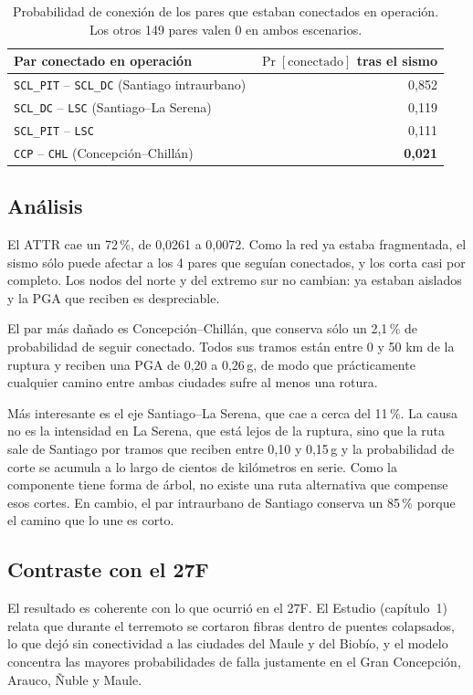 \documentclass[11pt,a4paper]{article}
\newcommand{\cod}[1]{\texttt{#1}}
\begin{document}
\begin{table}[h]
\centering
\begin{tabular}{lr}
\toprule
Par conectado en operación & $\Pr[\text{conectado}]$ tras el sismo \\
\midrule
\cod{SCL\_PIT} -- \cod{SCL\_DC} (Santiago intraurbano) & 0,852 \\
\cod{SCL\_DC} -- \cod{LSC} (Santiago--La Serena) & 0,119 \\
\cod{SCL\_PIT} -- \cod{LSC} & 0,111 \\
\cod{CCP} -- \cod{CHL} (Concepción--Chillán) & \textbf{0,021} \\
\bottomrule
\end{tabular}
\caption{Probabilidad de conexión de los pares que estaban conectados en operación. Los otros 149
pares valen 0 en ambos escenarios.}
\end{table}

\subsection{Análisis}
El ATTR cae un 72\,\%, de 0,0261 a 0,0072. Como la red ya estaba fragmentada, el sismo sólo puede
afectar a los 4 pares que seguían conectados, y los corta casi por completo. Los nodos del norte y del
extremo sur no cambian: ya estaban aislados y la PGA que reciben es despreciable.

El par más dañado es Concepción--Chillán, que conserva sólo un 2,1\,\% de probabilidad de seguir
conectado. Todos sus tramos están entre 0 y 50 km de la ruptura y reciben una PGA de 0,20 a 0,26\,g, de
modo que prácticamente cualquier camino entre ambas ciudades sufre al menos una rotura.

Más interesante es el eje Santiago--La Serena, que cae a cerca del 11\,\%. La causa no es la intensidad
en La Serena, que está lejos de la ruptura, sino que la ruta sale de Santiago por tramos que reciben
entre 0,10 y 0,15\,g y la probabilidad de corte se acumula a lo largo de cientos de kilómetros en serie.
Como la componente tiene forma de árbol, no existe una ruta alternativa que compense esos cortes. En
cambio, el par intraurbano de Santiago conserva un 85\,\% porque el camino que lo une es corto.

\subsection{Contraste con el 27F}
El resultado es coherente con lo que ocurrió en el 27F. El Estudio (capítulo~1) relata que durante el
terremoto se cortaron fibras dentro de puentes colapsados, lo que dejó sin conectividad a las ciudades
del Maule y del Biobío, y el modelo concentra las mayores probabilidades de falla justamente en el Gran
Concepción, Arauco, Ñuble y Maule.
\end{document}
